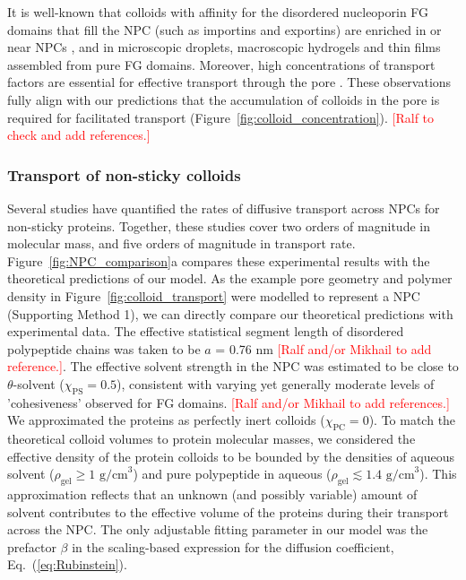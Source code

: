 \documentclass[12pt, a4paper]{article}
\newcommand\todo[1]{\textcolor{red}{#1}}
\begin{document}
It is well-known that colloids with affinity for the disordered nucleoporin FG domains that fill the NPC (such as importins and exportins) are enriched in or near NPCs \cite{Beck2007, Gruenwald2010, Tu2011}, and in microscopic droplets, macroscopic hydrogels and thin films assembled from pure FG domains.
Moreover, high concentrations of transport factors are essential for effective transport through the pore \cite{Lowe2015}.
These observations fully align with our predictions that the accumulation of colloids in the pore is required for facilitated transport (Figure~\ref{fig:colloid_concentration}).
\todo{[Ralf to check and add references.]}


\subsubsection{Transport of non-sticky colloids}

Several studies \cite{Ribbeck2001, Mohr2009, Popken2015, Timney2016, Frey2018} have quantified the rates of diffusive transport across NPCs for non-sticky proteins.
Together, these studies cover two orders of magnitude in molecular mass, and five orders of magnitude in transport rate. 
Figure~\ref{fig:NPC_comparison}a compares these experimental results with the theoretical predictions of our model.
As the example pore geometry and polymer density in Figure~\ref{fig:colloid_transport} were modelled to represent a NPC (Supporting Method 1), we can directly compare our theoretical predictions with experimental data.
The effective statistical segment length of disordered polypeptide chains was taken to be $a$ = 0.76 nm \todo{[Ralf and/or Mikhail to add reference.]}.
The effective solvent strength in the NPC was estimated to be close to $\theta$-solvent ($\chi_{\text{PS}} = 0.5$), consistent with varying yet generally moderate levels of 'cohesiveness' observed for FG domains. \todo{[Ralf and/or Mikhail to add references.]}
We approximated the proteins as perfectly inert colloids ($\chi_{\text{PC}} = 0$).
To match the theoretical colloid volumes to protein molecular masses, we considered the effective density of the protein colloids to be bounded by the densities of aqueous solvent ($\rho_{\text{gel}} \geq \text{1 g/cm}^3$) and pure polypeptide in aqueous ($\rho_{\text{gel}} \lesssim \text{1.4 g/cm}^3$).
This approximation reflects that an unknown (and possibly variable) amount of solvent contributes to the effective volume of the proteins during their transport across the NPC.
The only adjustable fitting parameter in our model was the prefactor $\beta$ in the scaling-based expression for the diffusion coefficient, Eq.~(\ref{eq:Rubinstein}).
\end{document}
